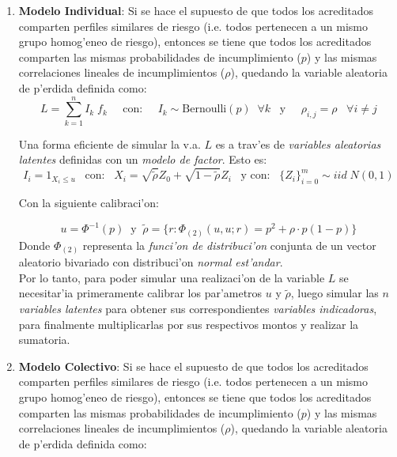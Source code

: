 \documentclass[10pt, oneside]{article}
\begin{document}
\begin{enumerate}

\item{\textbf{Modelo Individual}}: Si se hace el supuesto de que todos los acreditados comparten perfiles similares de riesgo (i.e. todos pertenecen a un mismo grupo homog'eneo de riesgo), entonces se tiene que todos los acreditados comparten las mismas probabilidades de incumplimiento ($p$) y las mismas correlaciones lineales de incumplimientos ($\rho$), quedando la variable aleatoria de p'erdida definida como:\\

\[L = \sum_{k=1}^{n} I_k\;f_k\;\;\;\;\;\mbox{con:}\;\;\;\;\;I_k\sim\mbox{Bernoulli}(p) \;\; \forall k \;\;\;\mbox{y}\;\;\;\;\; \rho_{i,j} =\rho \;\;\; \forall i \neq j\]

\noindent
Una forma eficiente de simular la v.a. $L$ es a trav'es de \emph{variables aleatorias latentes} definidas con un \emph{modelo de factor}. Esto es:\\

\begin{equation}\label{vlatente}
I_i = 1_{X_i\leq u} \;\;\;\mbox{con:}\;\;\; X_i = \sqrt{\widetilde{\rho}} Z_0 + \sqrt{1-\widetilde{\rho}} Z_i \;\;\;\mbox{y con:}\;\;\; \{ Z_i \}_{i=0}^{m}  \sim iid \; N(0,1)
\end{equation}

\noindent
Con la siguiente calibraci'on:

\[u = \Phi^{-1}(p) \;\;\mbox{y}\;\; \widetilde{\rho} = \{r : \Phi_{(2)}(u,u ;r) =  p^2+ \rho \cdot p(1-p) \}\]
\noindent
Donde $ \Phi_{(2)}$ representa la \emph{funci'on de distribuci'on} conjunta de un vector aleatorio bivariado con distribuci'on \emph{normal est'andar}.\\

\noindent
Por lo tanto, para poder simular una realizaci'on de la variable $L$ se necesitar'ia primeramente calibrar los par'ametros $u$ y $\widetilde{\rho}$, luego simular las $n$ \emph{variables latentes} para obtener sus correspondientes \emph{variables indicadoras}, para finalmente multiplicarlas por sus respectivos montos y realizar la sumatoria.

\item{\textbf{Modelo Colectivo}}: Si se hace el supuesto de que todos los acreditados comparten perfiles similares de riesgo (i.e. todos pertenecen a un mismo grupo homog'eneo de riesgo), entonces se tiene que todos los acreditados comparten las mismas probabilidades de incumplimiento ($p$) y las mismas correlaciones lineales de incumplimientos ($\rho$), quedando la variable aleatoria de p'erdida definida como:\\


\end{enumerate}
\end{document}

